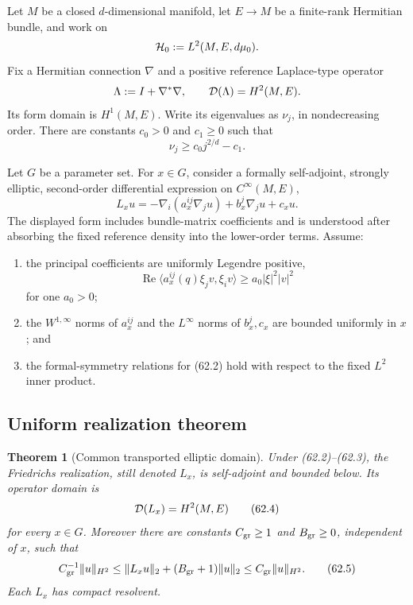 \documentclass[11pt]{article}
\newtheorem{theorem}{Theorem}[section]
\theoremstyle{remark}
\begin{document}
Let \(M\) be a closed \(d\)-dimensional manifold, let \(E\to M\) be
a finite-rank Hermitian bundle, and work on
\[
 {\cal H}_0:=L^2(M,E,d\mu_0).
\]
Fix a Hermitian connection \(\nabla\) and a positive reference
Laplace-type operator
\[
 \Lambda:=I+\nabla^*\nabla,
 \qquad
 {\cal D}(\Lambda)=H^2(M,E).
\]
Its form domain is \(H^1(M,E)\).  Write its eigenvalues as
\(\nu_j\), in nondecreasing order.  There are constants
\(c_0>0\) and \(c_1\geq0\) such that
\begin{equation}
                         \nu_j\geq c_0j^{2/d}-c_1.
                                                        \tag{62.1}
\end{equation}

Let \(G\) be a parameter set.  For \(x\in G\), consider a formally
self-adjoint, strongly elliptic, second-order differential expression
on \(C^\infty(M,E)\),
\begin{equation}
 L_xu
 =
 -\nabla_i(a_x^{ij}\nabla_j u)
 +b_x^j\nabla_j u+c_xu.                           \tag{62.2}
\end{equation}
The displayed form includes bundle-matrix coefficients and is
understood after absorbing the fixed reference density into the
lower-order terms.  Assume:
\begin{enumerate}
\item the principal coefficients are uniformly Legendre positive,
\begin{equation}
 \operatorname{Re}
 \langle a_x^{ij}(q)\xi_jv,\xi_iv\rangle
 \geq a_0|\xi|^2|v|^2                            \tag{62.3}
\end{equation}
for one \(a_0>0\);
\item the \(W^{1,\infty}\) norms of \(a_x^{ij}\) and the
\(L^\infty\) norms of \(b_x^j,c_x\) are bounded uniformly in \(x\);
and
\item the formal-symmetry relations for (62.2) hold with respect to
the fixed \(L^2\) inner product.
\end{enumerate}

\subsection{Uniform realization theorem}

\begin{theorem}[Common transported elliptic domain]
\label{thm:v12v62-common-domain}
Under (62.2)--(62.3), the Friedrichs realization, still denoted
\(L_x\), is self-adjoint and bounded below.  Its operator domain is
\begin{equation}
                         {\cal D}(L_x)=H^2(M,E)    \tag{62.4}
\end{equation}
for every \(x\in G\).  Moreover there are constants
\(C_{\rm gr}\geq1\) and \(B_{\rm gr}\geq0\), independent of \(x\),
such that
\begin{equation}
 C_{\rm gr}^{-1}\|u\|_{H^2}
 \leq
 \|L_xu\|_2+(B_{\rm gr}+1)\|u\|_2
 \leq
 C_{\rm gr}\|u\|_{H^2}.                           \tag{62.5}
\end{equation}
Each \(L_x\) has compact resolvent.
\end{theorem}
\end{document}
